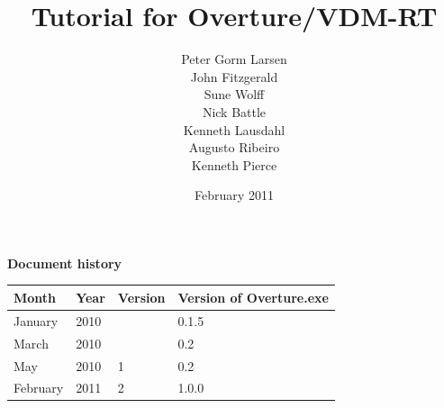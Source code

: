 \documentclass{overturerepsec}
\begin{document}
 
\title{Tutorial for Overture/VDM-RT}
\author{Peter Gorm Larsen\\
        John Fitzgerald \\
        Sune Wolff\\
        Nick Battle\\
        Kenneth Lausdahl\\
        Augusto Ribeiro\\
        Kenneth Pierce}

\date{February 2011}

{}     

\maketitle

{\textbf{Document history}}

\begin{tabular}{|l|l|l|l|}\hline
Month   & Year & Version & Version of Overture.exe \\ \hline
January & 2010 &   & 0.1.5 \\ \hline
March   & 2010     & & 0.2   \\ \hline
May     & 2010 & 1 & 0.2  \\ \hline
February& 2011 & 2 & 1.0.0\\ \hline
\end{tabular}

\tableofcontents
\newpage
% 




\setcounter{page}{1}
\addtocounter{chapter}{2}



\appendix






\end{document}
